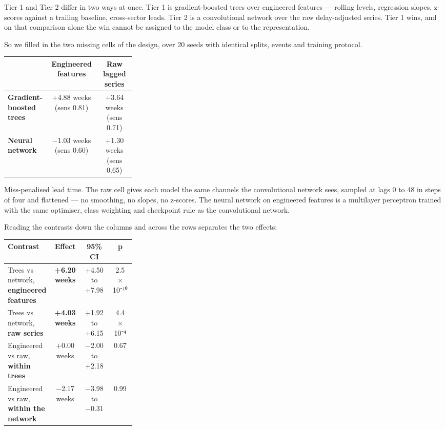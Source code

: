 \documentclass[11pt,a4paper]{article}
\begin{document}
Tier 1 and Tier 2 differ in two ways at once. Tier 1 is gradient-boosted trees over engineered features — rolling levels, regression slopes, z-scores against a trailing baseline, cross-sector leads. Tier 2 is a convolutional network over the raw delay-adjusted series. Tier 1 wins, and on that comparison alone the win cannot be assigned to the model class or to the representation.

So we filled in the two missing cells of the design, over 20 seeds with identical splits, events and training protocol.

\begin{center}\small
\begin{tabular}{p{0.29\linewidth}cc}\toprule
\textbf{} & \textbf{Engineered features} & \textbf{Raw lagged series} \\ \midrule
\textbf{Gradient-boosted trees} & +4.88 weeks (sens 0.81) & +3.64 weeks (sens 0.71) \\
\textbf{Neural network} & −1.03 weeks (sens 0.60) & +1.30 weeks (sens 0.65) \\
\bottomrule\end{tabular}
\end{center}

Miss-penalised lead time. The raw cell gives each model the same channels the convolutional network sees, sampled at lags 0 to 48 in steps of four and flattened — no smoothing, no slopes, no z-scores. The neural network on engineered features is a multilayer perceptron trained with the same optimiser, class weighting and checkpoint rule as the convolutional network.

Reading the contrasts down the columns and across the rows separates the two effects:

\begin{center}\small
\begin{tabular}{p{0.29\linewidth}ccc}\toprule
\textbf{Contrast} & \textbf{Effect} & \textbf{95\% CI} & \textbf{p} \\ \midrule
Trees vs network, \textbf{engineered features} & \textbf{+6.20 weeks} & +4.50 to +7.98 & 2.5 × 10⁻¹⁰ \\
Trees vs network, \textbf{raw series} & \textbf{+4.03 weeks} & +1.92 to +6.15 & 4.4 × 10⁻⁴ \\
Engineered vs raw, \textbf{within trees} & +0.00 weeks & −2.00 to +2.18 & 0.67 \\
Engineered vs raw, \textbf{within the network} & −2.17 weeks & −3.98 to −0.31 & 0.99 \\
\bottomrule\end{tabular}
\end{center}
\end{document}
